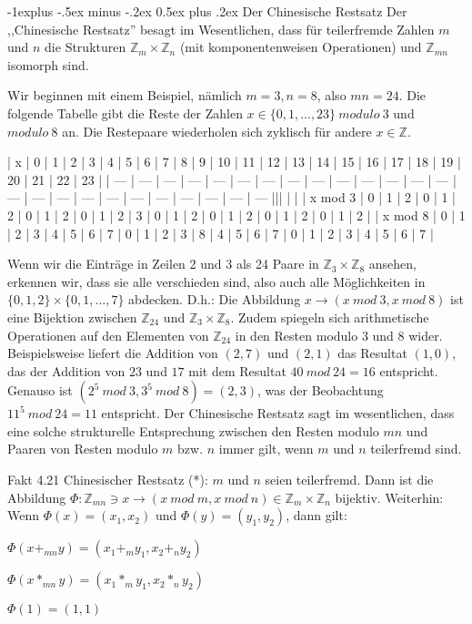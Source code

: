 \documentclass[a4paper]{article}
\makeatletter
\renewcommand{\subsection}{\@startsection{subsection}{2}{0mm}%
 {-1explus -.5ex minus -.2ex}%
 {0.5ex plus .2ex}%
 {\normalfont\normalsize\bfseries}}
\makeatother
\begin{document}
\begin{multicols}{3}
    \subsection{Der Chinesische Restsatz}
    Der ,,Chinesische Restsatz'' besagt im Wesentlichen, dass für teilerfremde Zahlen $m$ und $n$ die Strukturen $\mathbb{Z}_m \times\mathbb{Z}_n$ (mit komponentenweisen Operationen) und $\mathbb{Z}_{mn}$ isomorph sind.

    Wir beginnen mit einem Beispiel, nämlich $m=3,n=8$, also $mn=24$. Die folgende Tabelle gibt die Reste der Zahlen $x\in\{0,1,...,23\}\ modulo\ 3$ und $modulo\ 8$ an. Die Restepaare wiederholen sich zyklisch für andere $x\in\mathbb{Z}$.

    | x   | 0   | 1   | 2   | 3   | 4   | 5   | 6   | 7   | 8   | 9   | 10  | 11  | 12  | 13  | 14  | 15  | 16  | 17  | 18  | 19  | 20  | 21  | 22  | 23  |
    | --- | --- | --- | --- | --- | --- | --- | --- | --- | --- | --- | --- | --- | --- | --- | --- | --- | --- | --- | --- | --- | --- | --- | --- | --- |||  |  |
    | x mod 3 | 0   | 1   | 2   | 0   | 1   | 2   | 0   | 1   | 2   | 0   | 1   | 2   | 3   | 0   | 1   | 2   | 0   | 1   | 2   | 0   | 1   | 2   | 0   | 1   | 2   |
    | x mod 8 | 0   | 1   | 2   | 3   | 4   | 5   | 6   | 7   | 0   | 1   | 2   | 3   | 8   | 4   | 5   | 6   | 7   | 0   | 1   | 2   | 3   | 4   | 5   | 6   | 7   |

    Wenn wir die Einträge in Zeilen 2 und 3 als 24 Paare in $\mathbb{Z}_3 \times\mathbb{Z}_8$ ansehen, erkennen wir, dass sie alle verschieden sind, also auch alle Möglichkeiten in $\{0,1,2\}\times\{0,1,...,7\}$ abdecken. D.h.: Die Abbildung $x\rightarrow (x\ mod\ 3,x\ mod\ 8)$ ist eine Bijektion zwischen $\mathbb{Z}_{24}$ und $\mathbb{Z}_3\times\mathbb{Z}_8$. Zudem spiegeln sich arithmetische Operationen auf den Elementen von $\mathbb{Z}_{24}$ in den Resten modulo $3$ und $8$ wider. Beispielsweise liefert die Addition von $(2,7)$ und $(2,1)$ das Resultat $(1,0)$, das der Addition von $23$ und $17$ mit dem Resultat $40\ mod\ 24 = 16$ entspricht. Genauso ist $(2^5\ mod\ 3, 3^5\ mod\ 8)=(2,3)$, was der Beobachtung $11^5\ mod\ 24 = 11$ entspricht.
    Der Chinesische Restsatz sagt im wesentlichen, dass eine solche strukturelle Entsprechung zwischen den Resten modulo $mn$ und Paaren von Resten modulo $m$ bzw. $n$ immer gilt, wenn $m$ und $n$ teilerfremd sind.

    Fakt 4.21 Chinesischer Restsatz (*): $m$ und $n$ seien teilerfremd. Dann ist die Abbildung $\Phi:\mathbb{Z}_{mn} \owns x \rightarrow (x\ mod\ m, x\ mod\ n)\in\mathbb{Z}_m\times\mathbb{Z}_n$ bijektiv. Weiterhin: Wenn $\Phi(x)=(x_1,x_2)$ und $\Phi(y)=(y_1,y_2)$, dann gilt:
    \begin{enumerate*}
        \item $\Phi(x+_{mn} y) = (x_1 +_m y_1 , x_2 +_n y_2)$
        \item $\Phi(x*_{mn} y) = (x_1 *_m y_1 , x_2 *_n y_2)$
        \item  $\Phi(1) = (1,1)$
    \end{enumerate*}


\end{multicols}
\end{document}
